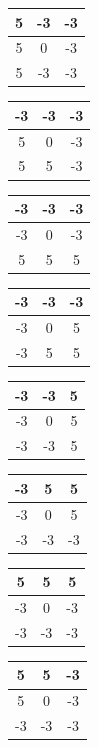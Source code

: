 \documentclass[
	12pt,				%
	oneside,			%
	a4paper,			%
	english,			%
	french,				%
	spanish,			%
	brazil,				%
	]{abntex2}
\begin{document}
\begin{tabular}{|c|c|c|}
    \hline
     5 & -3 & -3   \\ \hline
	 5 &  0 & -3   \\ \hline   
	 5 & -3 & -3   \\ \hline   
\end{tabular}
\begin{tabular}{|c|c|c|}
    \hline
    -3 & -3 & -3   \\ \hline
	 5 &  0 & -3   \\ \hline   
	 5 &  5 & -3   \\ \hline   
\end{tabular}
\begin{tabular}{|c|c|c|}
    \hline
    -3 & -3 & -3   \\ \hline
	-3 &  0 & -3   \\ \hline   
	 5 &  5 &  5   \\ \hline   
\end{tabular}
\begin{tabular}{|c|c|c|}
    \hline
    -3 & -3 & -3   \\ \hline
	-3 &  0 &  5   \\ \hline   
	-3 &  5 &  5   \\ \hline   
\end{tabular}

\begin{tabular}{|c|c|c|}
    \hline
    -3 & -3 &  5   \\ \hline
	-3 &  0 &  5   \\ \hline   
	-3 & -3 &  5   \\ \hline   
\end{tabular}
\begin{tabular}{|c|c|c|}
    \hline
    -3 &  5 &  5   \\ \hline
	-3 &  0 &  5   \\ \hline   
	-3 & -3 & -3   \\ \hline   
\end{tabular}
\begin{tabular}{|c|c|c|}
    \hline
     5 &  5 &  5   \\ \hline
	-3 &  0 & -3   \\ \hline   
	-3 & -3 & -3   \\ \hline   
\end{tabular}
\begin{tabular}{|c|c|c|}
    \hline
     5 &  5 & -3   \\ \hline
	 5 &  0 & -3   \\ \hline   
	-3 & -3 & -3   \\ \hline   
\end{tabular}
\end{document}
